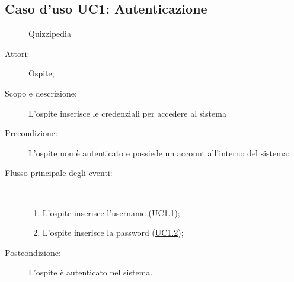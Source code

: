 \hypertarget{UC1}{}
\subsection{Caso d'uso UC1: Autenticazione}
	\begin{figure}[H]
		\centering
		\begin{resizedtikzpicture}{\textwidth}
		\begin{umlsystem}[x=0, fill=lightgray!20]{Quizzipedia}
		\end{umlsystem}
		\end{resizedtikzpicture}
		\caption{}
	\end{figure}
\begin{description}
\item[Attori:] Ospite;
\item[Scopo e descrizione:] L'ospite inserisce le credenziali per accedere al sistema
      \item[Precondizione:] L'ospite non è autenticato e possiede un account all'interno del sistema;

        \item[Flusso principale degli eventi:] \ 
 \begin{enumerate}
          \item L'ospite inserisce l'username (\hyperlink{UC1.1}{UC1.1});
          \item L'ospite inserisce la password (\hyperlink{UC1.2}{UC1.2});

      \end{enumerate}
    \item[Postcondizione:] L’ospite è autenticato nel sistema.
  \end{description}
\hypertarget{UC1.1}{}
